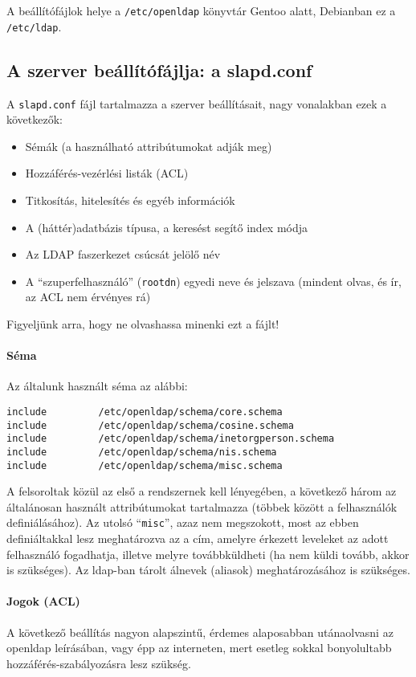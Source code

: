 A beállítófájlok helye a \texttt{/etc/openldap} könyvtár Gentoo alatt, Debianban ez a \texttt{/etc/ldap}.

\subsection{A szerver beállítófájlja: a slapd.conf}
A \texttt{slapd.conf} fájl tartalmazza a szerver beállításait, nagy vonalakban ezek a következők:

\begin{itemize}
\item Sémák (a használható attribútumokat adják meg)
\item Hozzáférés-vezérlési listák (ACL)
\item Titkosítás, hitelesítés és egyéb információk
\item A (háttér)adatbázis típusa, a keresést segítő index módja
\item Az LDAP faszerkezet csúcsát jelölő név
\item A ``szuperfelhasználó'' (\texttt{rootdn}) egyedi neve és jelszava (mindent olvas, és ír, az ACL nem érvényes rá)
\end{itemize}  

Figyeljünk arra, hogy ne olvashassa minenki ezt a fájlt!

\paragraph{Séma} Az általunk használt séma az alábbi:

\begin{Verbatim}[frame=single]
include         /etc/openldap/schema/core.schema
include         /etc/openldap/schema/cosine.schema
include         /etc/openldap/schema/inetorgperson.schema
include         /etc/openldap/schema/nis.schema
include         /etc/openldap/schema/misc.schema
\end{Verbatim}
  
A felsoroltak közül az első a rendszernek kell lényegében, a következő három az általánosan használt attribútumokat tartalmazza
(többek között a felhasználók definiálásához). Az utolsó ``\texttt{misc}'', azaz nem megszokott, most az ebben
definiáltakkal lesz meghatározva az a cím, amelyre érkezett leveleket az adott felhasználó fogadhatja, illetve melyre
továbbküldheti (ha nem küldi tovább, akkor is szükséges). Az ldap-ban tárolt álnevek (aliasok) meghatározásához is
szükséges.

\paragraph{Jogok (ACL)} A következő beállítás nagyon alapszintű, érdemes alaposabban utánaolvasni az openldap
leírásában, vagy épp az interneten, mert esetleg sokkal bonyolultabb hozzáférés-szabályozásra lesz szükség.

